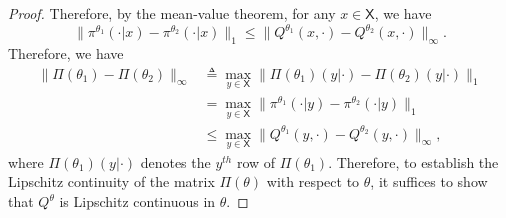 \documentclass[11pt]{article}
\newcommand{\sX}{{\mathsf X}}
\begin{document}
\begin{proof}
{Therefore, by the mean-value theorem, for any $x \in \sX$, we have 
$$
\|\pi^{\theta_1}(\cdot|x) - \pi^{\theta_2}(\cdot|x)\|_1 \leq \|Q^{\theta_1}(x,\cdot) - Q^{\theta_2}(x,\cdot)\|_{\infty}.
$$
}
Therefore, we have 
\begin{align*}
\|\Pi(\theta_1)-\Pi(\theta_2)\|_{\infty} &\triangleq \max_{y \in \sX} \|\Pi(\theta_1)(y|\cdot) - \Pi(\theta_2)(y|\cdot)\|_1 \\ &= \max_{y \in \sX} \|\pi^{\theta_1}(\cdot|y) - \pi^{\theta_2}(\cdot|y)\|_1 \\
&\leq \max_{y \in \sX} \|Q^{\theta_1}(y,\cdot) - Q^{\theta_2}(y,\cdot)\|_{\infty}, 
\end{align*}
where $\Pi(\theta_1)(y|\cdot)$ denotes the $y^{th}$ row of $\Pi(\theta_1)$. Therefore, to establish the Lipschitz continuity of the matrix $\Pi(\theta)$ with respect to $\theta$, it suffices to show that $Q^{\theta}$ is Lipschitz continuous in $\theta$.


\end{proof}
\end{document}
